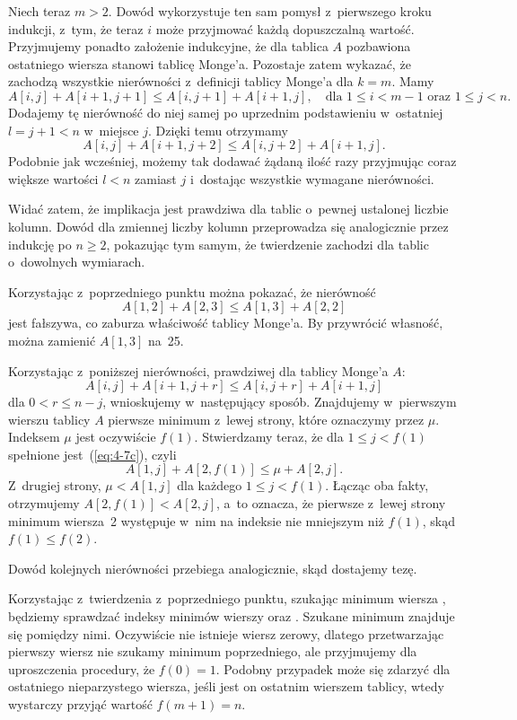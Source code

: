 Niech teraz $m>2$. Dowód wykorzystuje ten sam pomysł z~pierwszego kroku indukcji, z~tym, że teraz $i$ może przyjmować każdą dopuszczalną wartość. Przyjmujemy ponadto założenie indukcyjne, że dla tablica $A$ pozbawiona ostatniego wiersza stanowi tablicę Monge'a. Pozostaje zatem wykazać, że zachodzą wszystkie nierówności z~definicji tablicy Monge'a dla $k=m$. Mamy
\[
	A[i,j]+A[i+1,j+1] \le A[i,j+1]+A[i+1,j], \quad\text{dla $1\le i<m-1$ oraz $1\le j<n$}.
\]
Dodajemy tę nierówność do niej samej po uprzednim podstawieniu w~ostatniej $l=j+1<n$ w~miejsce $j$. Dzięki temu otrzymamy
\[
	A[i,j]+A[i+1,j+2] \le A[i,j+2]+A[i+1,j].
\]
Podobnie jak wcześniej, możemy tak dodawać żądaną ilość razy przyjmując coraz większe wartości $l<n$ zamiast $j$ i~dostając wszystkie wymagane nierówności.

Widać zatem, że implikacja jest prawdziwa dla tablic o~pewnej ustalonej liczbie kolumn. Dowód dla zmiennej liczby kolumn przeprowadza się analogicznie przez indukcję po $n\ge2$, pokazując tym samym, że twierdzenie zachodzi dla tablic o~dowolnych wymiarach.

\subproblem %
Korzystając z~poprzedniego punktu można pokazać, że nierówność
\[
	A[1,2]+A[2,3] \le A[1,3]+A[2,2]
\]
jest fałszywa, co zaburza właściwość tablicy Monge'a. By przywrócić własność, można zamienić $A[1,3]$ na~25.

\subproblem %
Korzystając z~poniższej nierówności, prawdziwej dla tablicy Monge'a $A$:
\[
	A[i,j]+A[i+1,j+r] \le A[i,j+r]+A[i+1,j] \tag{$*$}\label{eq:4-7c}
\]
dla $0<r\le n-j$, wnioskujemy w~następujący sposób. Znajdujemy w~pierwszym wierszu tablicy $A$ pierwsze minimum z~lewej strony, które oznaczymy przez $\mu$. Indeksem $\mu$ jest oczywiście $f(1)$. Stwierdzamy teraz, że dla $1\le j<f(1)$ spełnione jest~(\ref{eq:4-7c}), czyli
\[
    A[1,j]+A[2,f(1)] \le \mu+A[2,j].
\]
Z~drugiej strony, $\mu<A[1,j]$ dla każdego $1\le j<f(1)$. Łącząc oba fakty, otrzymujemy $A[2,f(1)]<A[2,j]$, a~to oznacza, że pierwsze z~lewej strony minimum wiersza~2 występuje w~nim na indeksie nie mniejszym niż $f(1)$, skąd $f(1)\le f(2)$.

Dowód kolejnych nierówności przebiega analogicznie, skąd dostajemy tezę.

\subproblem %
Korzystając z~twierdzenia z~poprzedniego punktu, szukając minimum wiersza , będziemy sprawdzać indeksy minimów wierszy  oraz . Szukane minimum znajduje się pomiędzy nimi. Oczywiście nie istnieje wiersz zerowy, dlatego przetwarzając pierwszy wiersz nie szukamy minimum poprzedniego, ale przyjmujemy dla uproszczenia procedury, że $f(0)=1$. Podobny przypadek może się zdarzyć dla ostatniego nieparzystego wiersza, jeśli jest on ostatnim wierszem tablicy, wtedy wystarczy przyjąć wartość $f(m+1)=n$.

